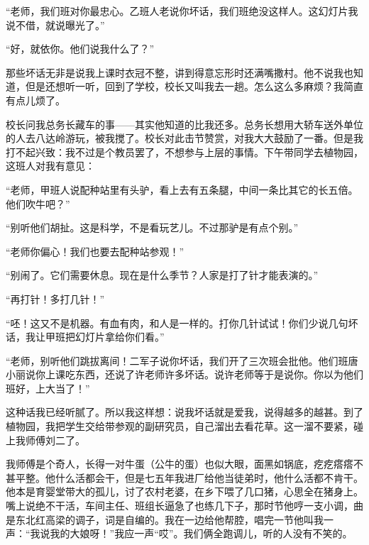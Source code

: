  “老师，我们班对你最忠心。乙班人老说你坏话，我们班绝没这样人。这幻灯片我说不借，就说曝光了。” 
 
 “好，就依你。他们说我什么了？” 
 
 那些坏话无非是说我上课时衣冠不整，讲到得意忘形时还满嘴撒村。他不说我也知道，但是还想听一听，回到了学校，校长又叫我去一趟。怎么这么多麻烦？我简直有点儿烦了。 
 
 校长问我总务长藏车的事——其实他知道的比我还多。总务长想用大轿车送外单位的人去八达岭游玩，被我搅了。校长对此击节赞赏，对我大大鼓励了一番。但是我打不起兴致：我不过是个教员罢了，不想参与上层的事情。下午带同学去植物园，这班人对我有意见： 
 
 “老师，甲班人说配种站里有头驴，看上去有五条腿，中间一条比其它的长五倍。他们吹牛吧？” 
 
 “别听他们胡扯。这是科学，不是看玩艺儿。不过那驴是有点个别。” 
 
 “老师你偏心！我们也要去配种站参观！” 
 
 “别闹了。它们需要休息。现在是什么季节？人家是打了针才能表演的。” 
 
 “再打针！多打几针！” 
 
 “呸！这又不是机器。有血有肉，和人是一样的。打你几针试试！你们少说几句坏话，我让甲班把幻灯片拿给你们看。” 
 
 “老师，别听他们跳拔离间！二军子说你坏话，我们开了三次班会批他。他们班唐小丽说你上课吃东西，还说了许老师许多坏话。说许老师等于是说你。你以为他们班好，上大当了！” 
 
 这种话我已经听腻了。所以我这样想：说我坏话就是爱我，说得越多的越甚。到了植物园，我把学生交给带参观的副研究员，自己溜出去看花草。这一溜不要紧，碰上我师傅刘二了。 
 
 我师傅是个奇人，长得一对牛蛋（公牛的蛋）也似大眼，面黑如锅底，疙疙瘩瘩不甚平整。他什么活都会干，但是七五年我进厂给他当徒弟时，他什么活都不肯干。他本是育婴堂带大的孤儿，讨了农村老婆，在乡下喂了几口猪，心思全在猪身上。嘴上说绝不干活，车间主任、班组长逼急了也练几下子，那时节他哼一支小调，曲是东北红高梁的调子，词是自编的。我在一边给他帮腔，唱完一节他叫我一声：“我说我的大娘呀！”我应一声“哎”。我们俩全跑调儿，听的人没有不笑的。 
 
